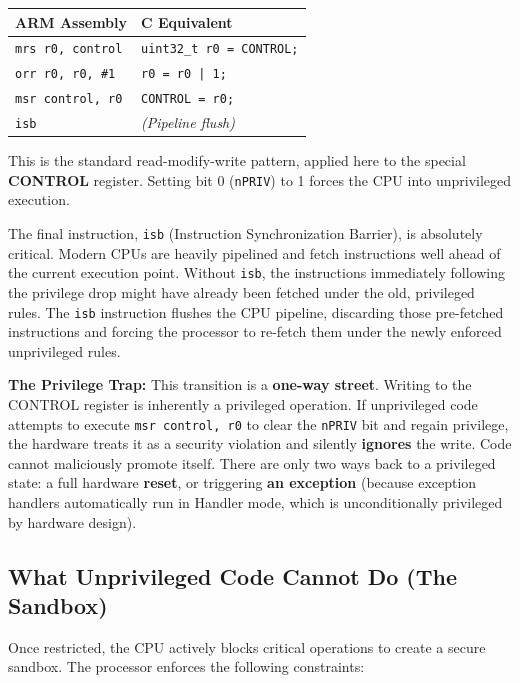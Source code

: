 \begin{table}[h!]
    \centering
    \begin{tabular}{|l|l|}
        \hline
        \textbf{ARM Assembly} & \textbf{C Equivalent} \\ \hline
        \texttt{mrs r0, control} & \texttt{uint32\_t r0 = CONTROL;} \\
        \texttt{orr r0, r0, \#1} & \texttt{r0 = r0 | 1;} \\
        \texttt{msr control, r0} & \texttt{CONTROL = r0;} \\
        \texttt{isb} & \textit{(Pipeline flush)} \\ \hline
    \end{tabular}
\end{table}

This is the standard read-modify-write pattern, applied here to the special \textbf{CONTROL} register. Setting bit 0 (\texttt{nPRIV}) to 1 forces the CPU into unprivileged execution. 

The final instruction, \texttt{isb} (Instruction Synchronization Barrier), is absolutely critical. Modern CPUs are heavily pipelined and fetch instructions well ahead of the current execution point. Without \texttt{isb}, the instructions immediately following the privilege drop might have already been fetched under the old, privileged rules. The \texttt{isb} instruction flushes the CPU pipeline, discarding those pre-fetched instructions and forcing the processor to re-fetch them under the newly enforced unprivileged rules.

\textbf{The Privilege Trap:} This transition is a \textbf{one-way street}. Writing to the CONTROL register is inherently a privileged operation. If unprivileged code attempts to execute \texttt{msr control, r0} to clear the \texttt{nPRIV} bit and regain privilege, the hardware treats it as a security violation and silently \textbf{ignores} the write. Code cannot maliciously promote itself. There are only two ways back to a privileged state: a full hardware \textbf{reset}, or triggering \textbf{an exception} (because exception handlers automatically run in Handler mode, which is unconditionally privileged by hardware design).

\subsection{What Unprivileged Code Cannot Do (The Sandbox)}
Once restricted, the CPU actively blocks critical operations to create a secure sandbox. The processor enforces the following constraints:


